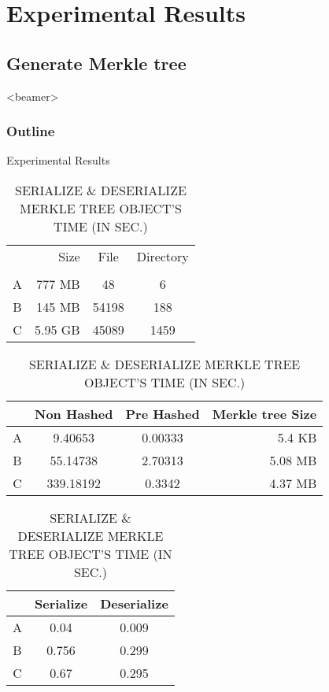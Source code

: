\section{Experimental Results}

\subsection{Generate Merkle tree}
\begin{frame}<beamer>
    \frametitle{Outline}
    \tableofcontents[currentsubsection]
\end{frame}

\begin{frame}{Experimental Results}
	\begin{table}[]
		\scriptsize
		\centering
		\begin{tabular}{crcc}
			  & Size    & File  & Directory \\
			  &			&		&		    \\
			A & 777 MB  & 48    & 6         \\
			B & 145 MB  & 54198 & 188       \\
			C & 5.95 GB & 45089 & 1459      \\
		\end{tabular}
        
		\caption{GENERATE MERKLE TREE'S TIME (IN SEC.)}
		\begin{tabular}{|c|c|c|r|}
			\hline
              & Non Hashed & Pre Hashed & Merkle tree Size \\ \hline
            A & 9.40653    & 0.00333    & 5.4 KB           \\ \hline
            B & 55.14738   & 2.70313    & 5.08 MB          \\ \hline
            C & 339.18192  & 0.3342     & 4.37 MB          \\ \hline
		\end{tabular}
        
        \caption{SERIALIZE \& DESERIALIZE MERKLE TREE OBJECT'S TIME (IN SEC.)}
		\begin{tabular}{|c|c|c|}
            \hline
              & Serialize & Deserialize \\ \hline
            A & 0.04      & 0.009       \\ \hline
            B & 0.756     & 0.299       \\ \hline
            C & 0.67      & 0.295       \\ \hline
		\end{tabular}
	\end{table}
\end{frame}

